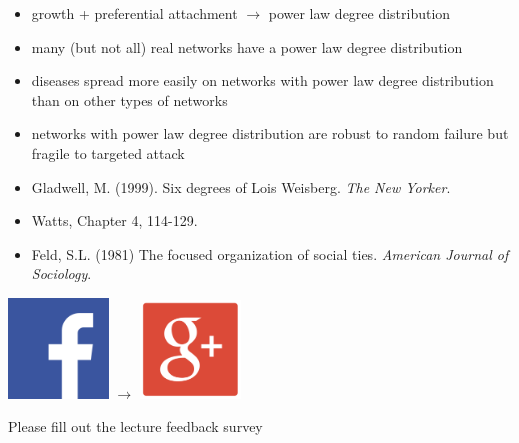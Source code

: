 \documentclass[aspectratio=169]{beamer}
\begin{document}
\begin{frame}

\begin{itemize}
\item growth + preferential attachment $\rightarrow$ power law degree distribution
\pause
\item many (but not all) real networks have a power law degree distribution 
\pause
\item diseases spread more easily on networks with power law degree distribution than on other types of networks
\pause
\item networks with power law degree distribution are robust to random failure but fragile to targeted attack
\end{itemize}


\end{frame}
\begin{frame}

\begin{itemize}
\item Gladwell, M. (1999). Six degrees of Lois Weisberg. \textit{The New Yorker}.
\item Watts, Chapter 4, 114-129.
\item Feld, S.L. (1981) The focused organization of social ties. \textit{American Journal of Sociology}.
\end{itemize}

\vfill
\includegraphics[width = 0.20\textwidth]{figures/fb_icon.png} {\LARGE $\rightarrow$} \includegraphics[width = 0.20\textwidth]{figures/google_plus.png}



\end{frame}
\begin{frame}

Please fill out the lecture feedback survey

\end{frame}
\end{document}
